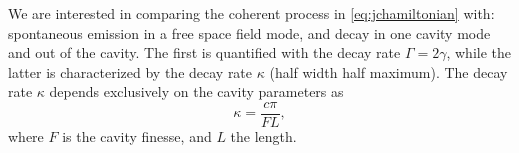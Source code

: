 We are interested in comparing the coherent process in \eqref{eq:jchamiltonian} with: spontaneous emission in a free space field mode, and decay in one cavity mode and out of the cavity. The first is quantified with the decay rate $\Gamma = 2\gamma$, while the latter is characterized by the decay rate $\kappa$ (half width half maximum). The decay rate $\kappa$ depends exclusively on the cavity parameters as \cite{helene}
\begin{equation}
\kappa =\frac{c\pi}{FL},
\end{equation}
where $F$ is the cavity finesse, and $L$ the length. %
